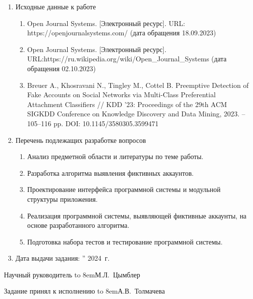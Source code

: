 \begin{adjustwidth}{-1.5cm}{0.5cm}
\begin{linespread}{1}
{\begin{enumerate}
	\bf\item Исходные данные к работе\rm
	\begin{enumerate}%
		\raggedright
		\item Open Journal Systems. [Электронный ресурс]. URL: https://openjournalsystems.com/ (дата обращения 18.09.2023)

		\item Open Journal Systems. [Электронный ресурс]. URL:https://ru.wikipedia.org/wiki/Open\_Journal\_Systems (дата обращения 02.10.2023)

		\item Breuer A., Khosravani N., Tingley M., Cottel B. Preemptive Detection of Fake Accounts on Social Networks via Multi-Class Preferential Attachment Classifiers // KDD '23: Proceedings of the 29th ACM SIGKDD Conference on Knowledge Discovery and Data Mining, 2023. – 105–116 pp. DOI: 10.1145/3580305.3599471

	\end{enumerate}

	\bf\item Перечень подлежащих разработке вопросов\rm
	\begin{enumerate}
		\item Анализ предметной области и литературы по теме работы.
		\item Разработка алгоритма выявления фиктивных аккаунтов.
		\item Проектирование интерфейса программной системы и модульной структуры приложения.
		\item Реализация программной системы, выявляющей фиктивные аккаунты, на основе разработанного алгоритма.
            \item Подготовка набора тестов и тестирование программной системы.
	\end{enumerate}

	\bf\item Дата выдачи задания: \rm
	\underline{\qquad}''\underfield{} 2024~г.
\end{enumerate}

\vspace{1em}

\noindent
{Научный руководитель}
\hfill
\hbox to 8em{М.Л.~Цымблер\hfill}

\vspace{1em}

\noindent
{Задание принял к исполнению}
\hfill
\hbox to 8em{А.В.~Толмачева\hfill}

}

\thispagestyle{empty}

\end{linespread}
\end{adjustwidth}

\pagebreak
